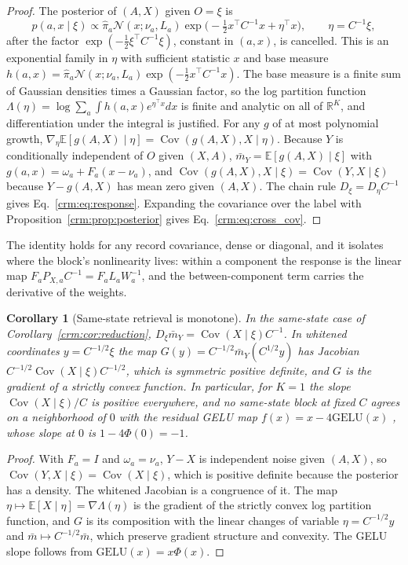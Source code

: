 \documentclass[11pt]{article}
\newtheorem{corollary}[theorem]{Corollary}
\theoremstyle{definition}
\theoremstyle{remark}
\newcommand{\E}{\mathbb E}
\newcommand{\R}{\mathbb R}
\newcommand{\Gauss}{\mathcal N}
\newcommand{\Cov}{\operatorname{Cov}}
\newcommand{\pihat}{\hat\pi}
\begin{document}
\begin{proof}
The posterior of $(A,X)$ given $O=\xi$ is
\[
p(a,x\mid\xi)\propto\pihat_a\Gauss(x;\nu_a,L_a)\exp\bigl(-\tfrac12x^\top C^{-1}x+\eta^\top x\bigr),\qquad \eta=C^{-1}\xi,
\]
after the factor $\exp(-\tfrac12\xi^\top C^{-1}\xi)$, constant in $(a,x)$, is cancelled. This is an exponential family in $\eta$ with sufficient statistic $x$ and base measure $h(a,x)=\pihat_a\Gauss(x;\nu_a,L_a)\exp(-\tfrac12x^\top C^{-1}x)$. The base measure is a finite sum of Gaussian densities times a Gaussian factor, so the log partition function $\Lambda(\eta)=\log\sum_a\int h(a,x)e^{\eta^\top x}dx$ is finite and analytic on all of $\R^K$, and differentiation under the integral is justified. For any $g$ of at most polynomial growth, $\nabla_\eta\E[g(A,X)\mid\eta]=\Cov(g(A,X),X\mid\eta)$. Because $Y$ is conditionally independent of $O$ given $(X,A)$, $\bar m_Y=\E[g(A,X)\mid\xi]$ with $g(a,x)=\omega_a+F_a(x-\nu_a)$, and $\Cov(g(A,X),X\mid\xi)=\Cov(Y,X\mid\xi)$ because $Y-g(A,X)$ has mean zero given $(A,X)$. The chain rule $D_\xi=D_\eta C^{-1}$ gives Eq.~\eqref{crm:eq:response}. Expanding the covariance over the label with Proposition~\ref{crm:prop:posterior} gives Eq.~\eqref{crm:eq:cross_cov}.
\end{proof}

The identity holds for any record covariance, dense or diagonal, and it isolates where the block's nonlinearity lives: within a component the response is the linear map $F_aP_{X,a}C^{-1}=F_aL_aW_a^{-1}$, and the between-component term carries the derivative of the weights.

\begin{corollary}[Same-state retrieval is monotone]
\label{crm:cor:same_state}
In the same-state case of Corollary~\ref{crm:cor:reduction}, $D_\xi\bar m_Y=\Cov(X\mid\xi)C^{-1}$. In whitened coordinates $y=C^{-1/2}\xi$ the map $G(y)=C^{-1/2}\bar m_Y(C^{1/2}y)$ has Jacobian $C^{-1/2}\Cov(X\mid\xi)C^{-1/2}$, which is symmetric positive definite, and $G$ is the gradient of a strictly convex function. In particular, for $K=1$ the slope $\Cov(X\mid\xi)/C$ is positive everywhere, and no same-state block at fixed $C$ agrees on a neighborhood of $0$ with the residual GELU map $f(x)=x-4\mathrm{GELU}(x)$ \citep{hendrycks2016gaussian}, whose slope at $0$ is $1-4\Phi(0)=-1$.
\end{corollary}

\begin{proof}
With $F_a=I$ and $\omega_a=\nu_a$, $Y-X$ is independent noise given $(A,X)$, so $\Cov(Y,X\mid\xi)=\Cov(X\mid\xi)$, which is positive definite because the posterior has a density. The whitened Jacobian is a congruence of it. The map $\eta\mapsto\E[X\mid\eta]=\nabla\Lambda(\eta)$ is the gradient of the strictly convex log partition function, and $G$ is its composition with the linear changes of variable $\eta=C^{-1/2}y$ and $\bar m\mapsto C^{-1/2}\bar m$, which preserve gradient structure and convexity. The GELU slope follows from $\mathrm{GELU}(x)=x\Phi(x)$.
\end{proof}
\end{document}
